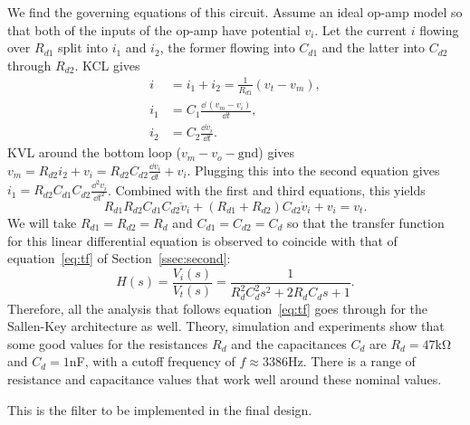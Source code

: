 We find the governing equations of this circuit. Assume an ideal op-amp model so
that both of the inputs of the op-amp have potential $v_i$. Let the current $i$
flowing over $R_{d1}$ split into $i_1$ and $i_2$, the former flowing into
$C_{d1}$ and the latter into $C_{d2}$ through $R_{d2}$. KCL gives
%
\vspace{-1em}
\begin{align*}
    i &= i_1 + i_2 = \frac{1}{R_{d1}}(v_t - v_m), \\
    i_1 &= C_1 \frac{\dd\, (v_m - v_i)}{\dd t}, \\
    i_2 &= C_2 \frac{\dd v_i}{\dd t}.
\end{align*}
%
KVL around the bottom loop ($v_m - v_o - \text{gnd}$) gives $v_m = R_{d2}i_2 +
v_i = R_{d2}C_{d2}\frac{\dd v_i}{\dd t} + v_i$. Plugging this into the second
equation gives $i_1 = R_{d2}C_{d1}C_{d2}\frac{\dd^2v_i}{\dd t^2}$. Combined with
the first and third equations, this yields
%
\begin{equation}
    R_{d1}R_{d2}C_{d1}C_{d2}\ddot{v}_i + (R_{d1} + R_{d2})C_{d2}\dot{v}_i + v_i
    = v_t.
    \label{eq:sallenkey_de}
\end{equation}
%
We will take $R_{d1} = R_{d2} = R_d$ and $C_{d1} = C_{d2} = C_d$ so that the
transfer function for this linear differential equation is observed to coincide
with that of equation~\eqref{eq:tf} of Section~\ref{ssec:second}: \[ H(s) =
\frac{V_i(s)}{V_t(s)} = \frac{1}{R_d^2C_d^2s^2 + 2R_dC_ds + 1}.\]
%
Therefore, all the analysis that follows equation~\eqref{eq:tf} goes through for
the Sallen-Key architecture as well. Theory, simulation and experiments show
that some good values for the resistances $R_d$ and the capacitances $C_d$ are
$R_d = 47$\unit{\kilo\ohm} and $C_d = 1$\unit{\nano\farad}, with a cutoff
frequency of $f \approx 3386$\unit{\hertz}. There is a range of resistance and
capacitance values that work well around these nominal values.

\begin{rem}
    This is the filter to be implemented in the final design.
\end{rem}
